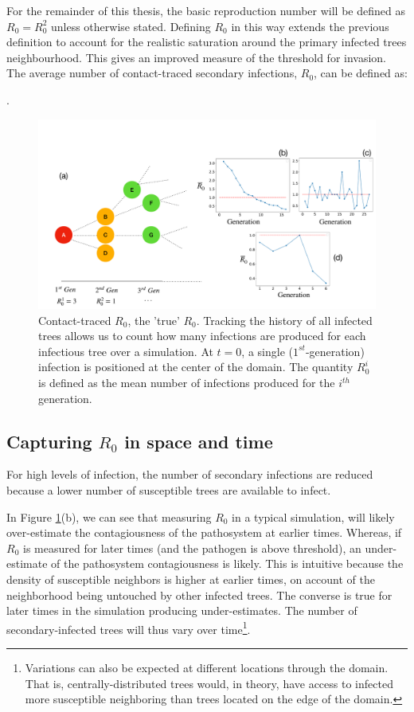 For the remainder of this thesis, the basic reproduction number will be defined as $R_0=R^2_0$ unless otherwise stated. 
Defining $R_0$ in this way extends the previous definition to account for the realistic %
saturation around the primary infected trees neighbourhood. This gives an improved measure %
of the threshold for invasion. The average number of contact-traced secondary infections, $R_0$, can be defined as:
\begin{defn}. %
\label{def:R0_contact_traced}
\end{defn}

\begin{figure}
    \centering
    \includegraphics[scale=0.255]{chapter5/figures/fig1.pdf}
    \caption{Contact-traced $R_0$, the 'true' $R_0$. Tracking the history of all infected trees allows us to count how many infections are produced for each infectious tree over a simulation. At $t=0$, a single ($1^{st}$-generation) infection is positioned at the center of the domain. The quantity $R^i_0$ is defined as the mean number of infections produced for  the $i^{th}$ generation.}
    \label{fig:contact-trace}
\end{figure}


\subsection{Capturing $R_0$ in space and time}

For high levels of infection, the number of secondary infections are reduced because a lower number of susceptible trees are available to infect. 

In Figure \ref{fig:contact-trace}(b), we can see that measuring $R_0$ in a typical simulation, %
will likely over-estimate the contagiousness of the pathosystem at earlier times. %
Whereas, if $R_0$ is measured for later times (and the pathogen is above threshold), an %
under-estimate of the pathosystem contagiousness is likely. %
This is intuitive because the density of susceptible neighbors is higher at earlier times, %
on account of the neighborhood being untouched by other infected trees. %
The converse is true for later times in the simulation producing under-estimates. %
The number of secondary-infected trees will thus vary over time\footnote{Variations can %
also be expected at different locations through the domain. That is, centrally-distributed %
trees would, in theory, have access to infected more susceptible neighboring than trees %
located on the edge of the domain.}. %

